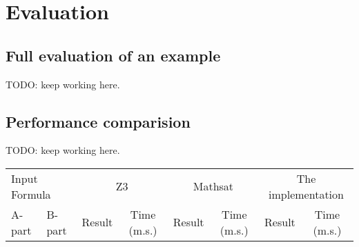 \section{Evaluation}

\subsection{Full evaluation of an example}
TODO: keep working here.

\subsection{Performance comparision}
TODO: keep working here.

\begin{tabular}{llcccccc} \toprule
  \multicolumn{2}{l}{Input Formula} & \multicolumn{2}{c}{Z3}& \multicolumn{2}{c}{Mathsat}& \multicolumn{2}{c}{The implementation} 
  \\\cmidrule(lr){1-2}\cmidrule(lr){3-4}\cmidrule(lr){5-6}\cmidrule(lr){7-8}
  A-part & B-part & Result & Time (m.s.) & Result & Time (m.s.) & Result & Time (m.s.) \\
  
\end{tabular}

